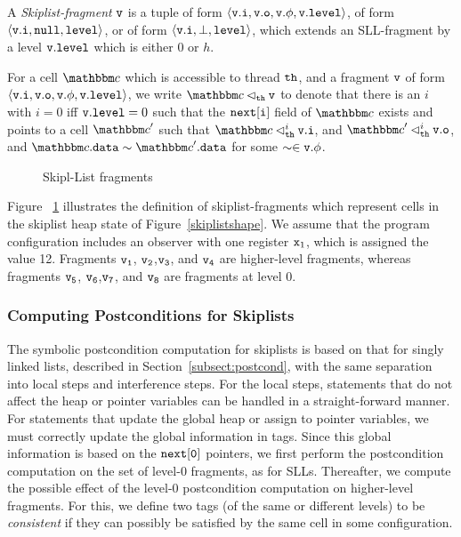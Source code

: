 \begin{definition}
\label{def:sll-fragment}
A {\em Skiplist-fragment} $\mathtt{v}$
is a tuple of form
$\left\langle\mathtt{v}.\mathtt{i},\mathtt{v}.\mathtt{o},\mathtt{v}.\phi,\mathtt{v}.\mathtt{level}\right\rangle$, of form
$\left\langle\mathtt{v}.\mathtt{i},{\tt null},\mathtt{level}\right\rangle$, or of form
$\left\langle\mathtt{v}.\mathtt{i},\bot,\mathtt{level}\right\rangle$,
which extends an SLL-fragment by a level $\mathtt{v}.\mathtt{level}$ which is either $0$ or $h$.
\end{definition}
For a cell $\cell$ which is accessible to thread ${\tt th}$, and a fragment
$\mathtt{v}$ of form $\left\langle\mathtt{v}.\mathtt{i},\mathtt{v}.\mathtt{o},\mathtt{v}.\phi,\mathtt{v}.\mathtt{level}\right\rangle$,
we write $\cell \satfrag{\thread}\frag$ to denote that
there is an $i$ with $i= 0$ iff $\mathtt{v}.\mathtt{level} = 0$ such that
the ${\tt next[i]}$ field of $\cell$ exists and points to a cell $\cell'$ such that
$\cell \satslfrag{\thread}{i} \inat{\frag}$, and
$\cell' \satslfrag{\thread}{i} \outat{\frag}$, and
$\cell.\mathtt{data} \sim \cell'.\mathtt{data}$ for some $\sim \in \mathtt{v}.\phi$.
 \begin{figure}  
  
 \caption{Skipl-List fragments}
 \label{skiplistabs}
\end{figure}
Figure ~\ref{skiplistabs} illustrates the definition of skiplist-fragments
which represent cells in the skiplist heap state of Figure~\ref{skiplistshape}.
We assume that the program configuration includes an observer with one
register $\mathtt{x}_1$, which is assigned the value 12.
Fragments $\tt v_1$, $\tt v_2$,$\tt v_3$, and $\tt v_4$ are higher-level
fragments, whereas fragments $\tt v_5$, $\tt v_6$,$\tt v_7$, and $\tt v_8$ are
fragments at level $0$.
 
\subsubsection{Computing Postconditions for Skiplists}
\label{subsect:postcond-skiplists}
The symbolic postcondition computation for skiplists is based on that for
singly linked lists, described in Section~\ref{subsect:postcond}, with the
same separation into local steps and interference steps.
For the local steps, statements that do not affect the heap or pointer
variables can be handled in a straight-forward manner.
For statements that update the global heap or assign to pointer variables,
we must correctly update the global information in tags.
Since this global information is based on the $\tt next[0]$ pointers,
we first perform the postcondition computation on the set of
level-0 fragments, as for SLLs. Thereafter, we compute the possible
effect of the level-0 postcondition computation  on higher-level fragments.
For this, we define two tags (of the same or different levels)
to be {\em consistent} if they can possibly be satisfied by the same
cell in some configuration.

